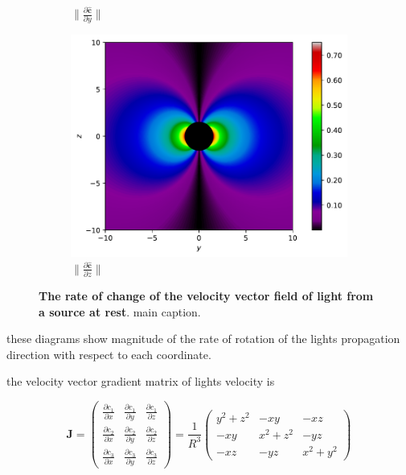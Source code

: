 \begin{figure}[H]
\begin{subfigure}{0.32\textwidth}
		\caption{$\|\frac{\partial \mathbf{\hat{c}}}{\partial y}\|$}
		\label{fig: Rate of change of lights velocity field of rest source subfig_2}
	\end{subfigure}
	\begin{subfigure}{0.32\textwidth}
		\centering
		\includegraphics[width=\textwidth]{images/pdf/Rate_of_change_of_lights_velocity_field_with_respect_to_z_u_is_0.pdf}
		\caption{$\|\frac{\partial \mathbf{\hat{c}}}{\partial z}\|$}
		\label{fig: Rate of change of lights velocity field of rest source subfig_3}
	\end{subfigure}
	\caption{\textbf{The rate of change of the velocity vector field of light from a source at rest}. main caption.}
	\label{fig: Rate of change of lights velocity field of rest source}
\end{figure}

these diagrams show magnitude of the rate of rotation of the lights propagation direction with respect to each coordinate.

the velocity vector gradient matrix of lights velocity is

\begin{equation}
	\mathbf{J} =
	\begin{pmatrix}
		\frac{\partial c_1}{\partial x} & \frac{\partial c_1}{\partial y} & \frac{\partial c_1}{\partial z} \\
		\frac{\partial c_2}{\partial x} & \frac{\partial c_2}{\partial y} & \frac{\partial c_2}{\partial z}
		\\
		\frac{\partial c_3}{\partial x} & \frac{\partial c_3}{\partial y} & \frac{\partial c_3}{\partial z}
	\end{pmatrix}
	= \frac{1}{ R^3 }
	\begin{pmatrix}
		y^2 + z^2 & -xy       & -xz       \\
		-xy       & x^2 + z^2 & -yz       \\
		-xz       & -yz       & x^2 + y^2
	\end{pmatrix}
\end{equation}

